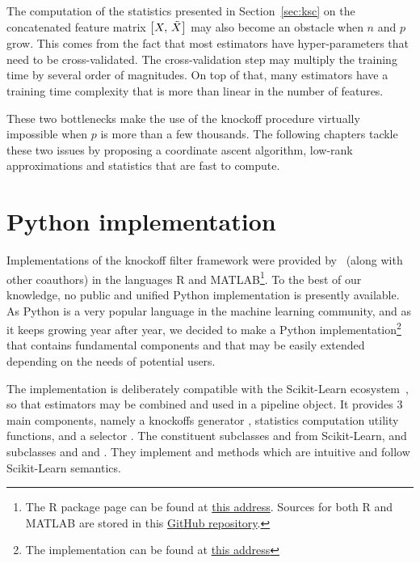 The computation of the statistics presented in Section~\ref{sec:ksc}
on the concatenated feature matrix $\big[ X,\, \tilde{X} \big]$ may also become an obstacle when $n$ and $p$ grow.
This comes from the fact that most estimators have hyper-parameters that need to be cross-validated.
The cross-validation step may multiply the training time by several order of magnitudes.
On top of that, many estimators have a training time complexity that is more than linear in the number of features.

\bigbreak
These two bottlenecks make the use of the knockoff procedure
virtually impossible when $p$ is more than a few thousands.
The following chapters tackle these two issues by proposing
a coordinate ascent algorithm, low-rank approximations
and statistics that are fast to compute.

\section{Python implementation}\label{sec:python_implementation}

Implementations of the knockoff filter framework were provided by~\cite{fixed_x_knockoffs, model_x_knockoffs}
(along with other coauthors) in the languages R and MATLAB\footnote{
    The R package page can be found at
    \href{https://cran.r-project.org/web/packages/knockoff/index.html}{this address}.
    Sources for both R and MATLAB are stored in this
    \href{https://github.com/msesia/knockoff-filter}{GitHub repository}.
}.
To the best of our knowledge, no public and unified Python implementation is presently available.
As Python is a very popular language in the machine learning community,
and as it keeps growing year after year,
we decided to make a Python implementation\footnote{
    The implementation can be found at
    \href{https://github.com/qrebjock/fanok}{this address}
} that contains fundamental components and that may be easily extended
depending on the needs of potential users.

The implementation is deliberately compatible with the Scikit-Learn ecosystem~\citep{sklearn},
so that estimators may be combined and used in a pipeline object.
It provides 3 main components,
namely a knockoffs generator ,
statistics computation utility functions,
and a selector .
The constituent  subclasses
 and  from Scikit-Learn,
and  subclasses
and  and .
They implement  and  methods which are intuitive and follow Scikit-Learn semantics.


